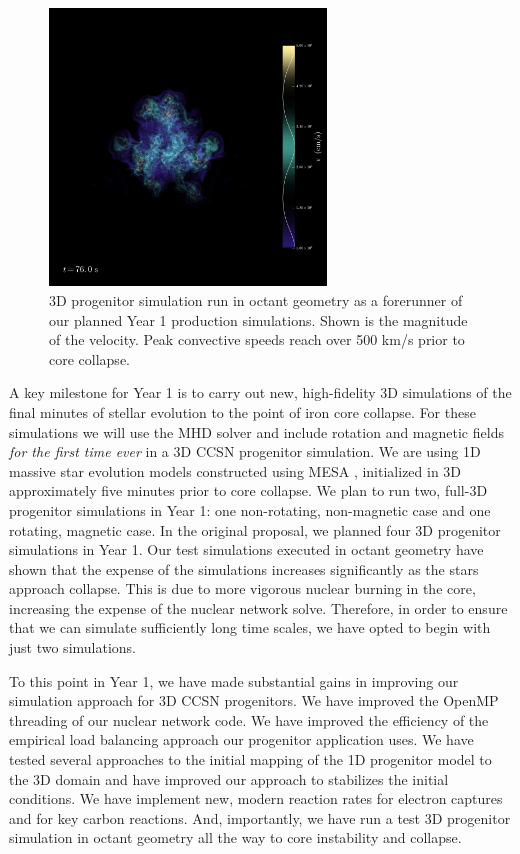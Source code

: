 \documentclass[12pt]{article}
\begin{document}
\begin{figure}
  \includegraphics[width=2.9in]{./mag_vel_face_on_no_rot_prog3d_oct_vol_annotated_0076.png}
  \caption{3D progenitor simulation run in octant geometry as a forerunner of our planned Year 1 production simulations. Shown is the magnitude of the velocity. Peak convective speeds reach over 500 km/s prior to core collapse.}
  \label{f.progen}
\end{figure}
A key milestone for Year 1 is to carry out new, high-fidelity 3D simulations of the final minutes of stellar evolution to the point of iron core collapse.
For these simulations we will use the \spark MHD solver \citep{couch:2018} and include rotation and magnetic fields {\it for the first time ever} in a 3D CCSN progenitor simulation.
We are using 1D massive star evolution models constructed using MESA \citep{paxton:2011, paxton:2013, paxton:2015}, initialized in 3D approximately five minutes prior to core collapse.
We plan to run two, full-3D progenitor simulations in Year 1: one non-rotating, non-magnetic case and one rotating, magnetic case.
In the original proposal, we planned four 3D progenitor simulations in Year 1.
Our test simulations executed in octant geometry have shown that the expense of the simulations increases significantly as the stars approach collapse.
This is due to more vigorous nuclear burning in the core, increasing the expense of the nuclear network solve.
Therefore, in order to ensure that we can simulate sufficiently long time scales, we have opted to begin with just two simulations.


To this point in Year 1, we have made substantial gains in improving our simulation approach for 3D CCSN progenitors.
We have improved the OpenMP threading of our nuclear network code. 
We have improved the efficiency of the empirical load balancing approach our progenitor application uses. 
We have tested several approaches to the initial mapping of the 1D progenitor model to the 3D domain and have improved our approach to stabilizes the initial conditions. 
We have implement new, modern reaction rates for electron captures and for key carbon reactions.
And, importantly, we have run a test 3D progenitor simulation in octant geometry all the way to core instability and collapse.
\end{document}
